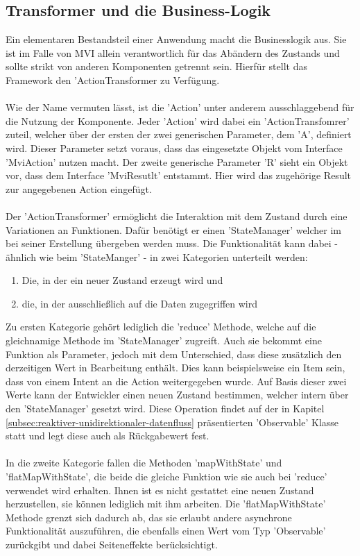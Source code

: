 \subsection{Transformer und die Business-Logik}
Ein elementaren Bestandsteil einer Anwendung macht die Businesslogik aus. Sie ist im Falle von MVI allein verantwortlich für das Abändern des Zustands und sollte strikt von anderen Komponenten getrennt sein.
Hierfür stellt das Framework den 'ActionTransformer zu Verfügung.
\\\\
Wie der Name vermuten lässt, ist die 'Action' unter anderem ausschlaggebend für die Nutzung der Komponente. Jeder 'Action' wird dabei ein 'ActionTransfomrer' zuteil, welcher über der ersten der zwei generischen Parameter, dem 'A', definiert wird. Dieser Parameter setzt voraus, dass das eingesetzte Objekt vom Interface 'MviAction' nutzen macht. Der zweite generische Parameter 'R' sieht ein Objekt vor, dass dem Interface 'MviResutlt' entstammt. Hier wird das zugehörige Result zur angegebenen Action eingefügt. 
\\\\
Der 'ActionTransformer' ermöglicht die Interaktion mit dem Zustand durch eine Variationen an Funktionen. Dafür benötigt er einen 'StateManager' welcher im bei seiner Erstellung übergeben werden muss. Die Funktionalität kann dabei - ähnlich wie beim 'StateManger' - in zwei Kategorien unterteilt werden:
\begin{enumerate}
	\item Die, in der ein neuer Zustand erzeugt wird und
	\item die, in der ausschließlich auf die Daten zugegriffen wird
\end{enumerate} 
Zu ersten Kategorie gehört lediglich die 'reduce' Methode, welche auf die gleichnamige Methode im 'StateManager' zugreift. Auch sie bekommt eine Funktion als Parameter, jedoch mit dem Unterschied, dass diese zusätzlich den derzeitigen Wert in Bearbeitung enthält. Dies kann beispielsweise ein Item sein, dass
von einem Intent an die Action weitergegeben wurde. Auf Basis dieser zwei Werte kann der Entwickler einen neuen Zustand bestimmen, welcher intern über den 'StateManager' gesetzt wird. Diese Operation findet auf der in Kapitel
\ref{subsec:reaktiver-unidirektionaler-datenfluss}
präsentierten 'Observable' Klasse statt und legt diese auch als Rückgabewert fest.
\\\\
In die zweite Kategorie fallen die Methoden 'mapWithState' und 'flatMapWithState', die beide die gleiche Funktion wie sie auch bei 'reduce' verwendet wird erhalten. Ihnen ist es nicht gestattet eine neuen Zustand herzustellen, sie können lediglich mit ihm arbeiten. Die 'flatMapWithState' Methode grenzt sich dadurch ab, das sie erlaubt andere asynchrone Funktionalität auszuführen, die ebenfalls einen Wert vom Typ 'Observable' zurückgibt und dabei Seiteneffekte berücksichtigt.
